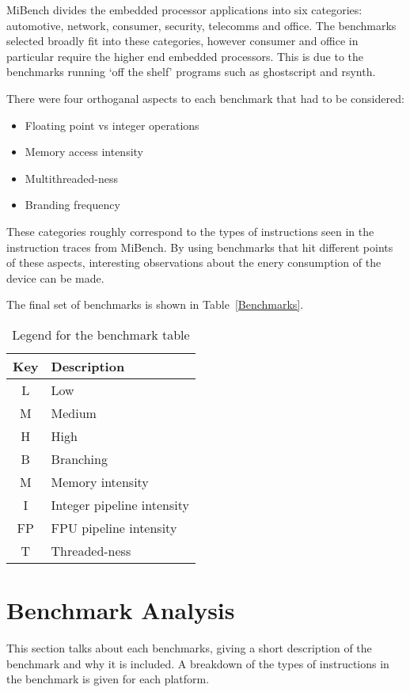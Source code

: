 \documentclass[twocolumn]{article}
\begin{document}
MiBench divides the embedded processor applications into six categories: automotive, network, consumer, security, telecomms and office. The benchmarks selected broadly fit into these categories, however consumer and office in particular require the higher end embedded processors. This is due to the benchmarks running `off the shelf' programs such as ghostscript and rsynth.

There were four orthoganal aspects to each benchmark that had to be considered:
\begin{itemize}
	\item Floating point vs integer operations
	\item Memory access intensity
	\item Multithreaded-ness
	\item Branding frequency
\end{itemize}

These categories roughly correspond to the types of instructions seen in the instruction traces from MiBench. By using benchmarks that hit different points of these aspects, interesting observations about the enery consumption of the device can be made. 

The final set of benchmarks is shown in Table~\ref{Benchmarks}.

\begin{table}
\centering
	\begin{tabular}{c l}
		Key & Description \\
		\hline
		L	&	Low \\
		M	&	Medium \\
		H	&	High \\
		\hline
		B	&	Branching \\
		M	&	Memory intensity \\
		I	&	Integer pipeline intensity \\
		FP	&	FPU pipeline intensity \\
		T	&	Threaded-ness \\
	\end{tabular}
	\caption{Legend for the benchmark table}
	\label{BenchmarkLegend}
\end{table}

\section*{Benchmark Analysis}

This section talks about each benchmarks, giving a short description of the benchmark and why it is included. A breakdown of the types of instructions in the benchmark is given for each platform.
\end{document}
